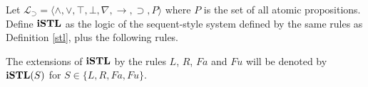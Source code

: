 \begin{dfn}\label{istl}
	Let $\mathcal{L}_\supset=\langle \wedge, \vee, \top, \bot, \nabla, \rightarrow, \supset, P \rangle$ where $P$ is the set of all atomic propositions. Define $\istl$ as the logic of the sequent-style system defined by the same rules as Definition \ref{stl}, plus the following rules.
\end{dfn}
\begin{multicols}{2}
  \begin{prooftree}
  \end{prooftree}
  \columnbreak
  \begin{prooftree}
  \end{prooftree}
\end{multicols}
The extensions of $\istl$ by the rules $L$, $R$, $Fa$ and $Fu$ will be denoted by $\istl(S)$ for $S \in \{ L, R, Fa, Fu \}$.